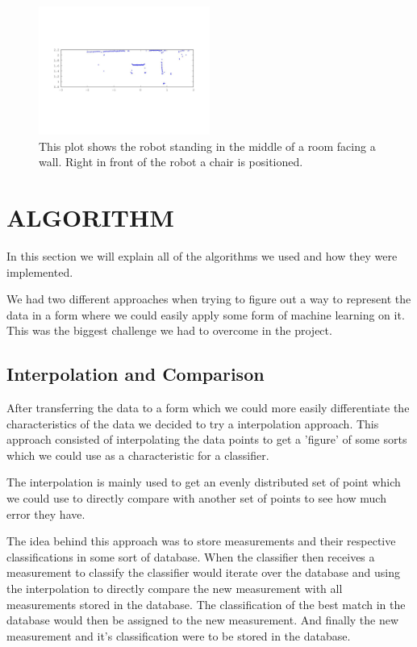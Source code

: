 \documentclass[a4paper, 10pt, conference]{ieeeconf}      %
\begin{document}
\begin{figure}
\centering
\includegraphics[width=0.5\textwidth]{presimg/chair.jpg}
\caption{This plot shows the robot standing in the middle of a room facing a wall. Right in front of the robot a chair is positioned.}
\label{chair}
\end{figure}

\section{ALGORITHM}
In this section we will explain all of the algorithms we used and how they were implemented. 

We had two different approaches when trying to figure out a way to represent the data in a form where we could easily apply some form of machine learning on it. This was the biggest challenge we had to overcome in the project. 

\subsection{Interpolation and Comparison}
After transferring the data to a form which we could more easily differentiate the characteristics of the data we decided to try a interpolation approach. This approach consisted of interpolating the data points to get a 'figure' of some sorts which we could use as a characteristic for a classifier.

The interpolation is mainly used to get an evenly distributed set of point which we could use to directly compare with another set of points to see how much error they have.

The idea behind this approach was to store measurements and their respective classifications in some sort of database. When the classifier then receives a measurement to classify the classifier would iterate over the database and using the interpolation to directly compare the new measurement with all measurements stored in the database. The classification of the best match in the database would then be assigned to the new measurement. And finally the new measurement and it's classification were to be stored in the database.
\end{document}
